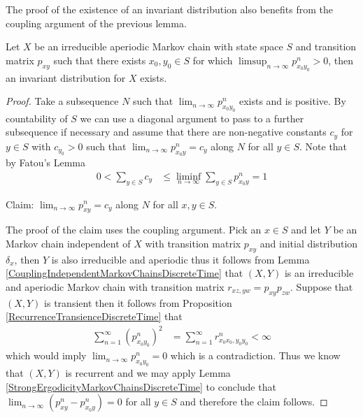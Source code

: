 The proof of the existence of an invariant distribution also benefits
from the coupling argument of the previous lemma.
\begin{lem}\label{TransitionMatrixConvergeToZeroNoInvariantDistribution}Let $X$ be an irreducible aperiodic Markov chain with state
  space $S$ and transition matrix $p_{xy}$ such that
  there exists $x_0,y_0 \in S$ for which $\limsup_{n \to \infty}
  p^n_{x_0 y_0} > 0$, then an invariant distribution for $X$ exists.
\end{lem}
\begin{proof}
Take a subsequence $N$ such that $\lim_{n \to \infty} p^n_{x_0 y_0}$
exists and is positive.  By countability of $S$ we can use a diagonal
argument to pass to a further subsequence if necessary and assume that
there are non-negative constants $c_y$ for $y \in S$ with $c_{y_0} > 0$ such that 
$\lim_{n\to \infty} p^n_{x_0 y} = c_y$ along $N$ for all $y \in S$.
Note that by Fatou's Lemma 
\begin{align*}
0 < \sum_{y \in S} c_y &\leq \liminf_{n \to \infty} \sum_{y \in S}
                            p^n_{x_0 y} = 1
\end{align*}

Claim: $\lim_{n \to \infty} p^n_{xy} = c_y$ along $N$ for all $x,y \in
S$.

The proof of the claim uses the coupling argument.  Pick an $x \in S$
and let $Y$ be an
Markov chain  independent of $X$ with transition matrix $p_{xy}$ and
initial distribution $\delta_x$, then
$Y$ is
also irreducible and aperiodic thus it follows from Lemma
\ref{CouplingIndependentMarkovChainsDiscreteTime}
that $(X,Y)$ is an irreducible and aperiodic Markov chain with
transition matrix $r_{xz,yw} = p_{xy} p_{zw}$.  Suppose
that $(X,Y)$ is transient then it follows from Proposition
\ref{RecurrenceTransienceDiscreteTime} that 
\begin{align*}
\sum_{n=1}^\infty (p^n_{x_0y_0})^2 &= \sum_{n=1}^\infty r^n_{x_0x_0,y_0y_0} < \infty
\end{align*}
which would imply $\lim_{n \to \infty} p^n_{x_0y_0} = 0$ which is a
contradiction. Thus we know that $(X,Y)$ is recurrent and we may apply
Lemma \ref{StrongErgodicityMarkovChainsDiscreteTime} to conclude that
$\lim_{n \to \infty} (p^n_{xy} - p^n_{x_0 y}) = 0$ for all $y \in S$
and therefore the claim follows.


\end{proof}
